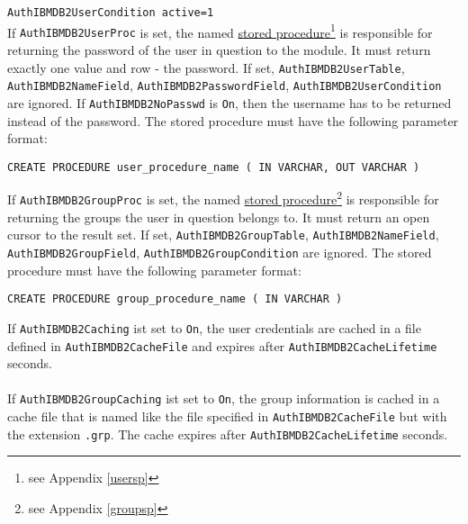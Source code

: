 \documentclass[11pt,letterpaper]{article}
\begin{document}
{\tt AuthIBMDB2UserCondition active=1}\\
\newpage
\noindent
If {\tt AuthIBMDB2UserProc} is set, the named \hyperlink{husersp}{stored procedure}\footnote{see Appendix \ref{usersp}} is responsible for returning the password of the user in question to the module. It must return exactly one value and row - the password. If set, {\tt AuthIBMDB2UserTable}, {\tt AuthIBMDB2NameField}, {\tt AuthIBMDB2PasswordField}, {\tt AuthIBMDB2UserCondition} are ignored. If {\tt AuthIBMDB2NoPasswd} is {\tt On}, then the username has to be returned instead of the password. The stored procedure must have the following parameter format:
\begin{verbatim}
CREATE PROCEDURE user_procedure_name ( IN VARCHAR, OUT VARCHAR )
\end{verbatim}
If {\tt AuthIBMDB2GroupProc} is set, the named \hyperlink{hgroupsp}{stored procedure}\footnote{see Appendix \ref{groupsp}} is responsible for returning the groups the user in question belongs to. It must return an open cursor to the result set. If set, {\tt AuthIBMDB2GroupTable}, {\tt AuthIBMDB2NameField}, {\tt AuthIBMDB2GroupField}, {\tt AuthIBMDB2GroupCondition} are ignored. The stored procedure must have the following parameter format:
\begin{verbatim}
CREATE PROCEDURE group_procedure_name ( IN VARCHAR )
\end{verbatim}
If {\tt AuthIBMDB2Caching} ist set to {\tt On}, the user credentials are cached in a file defined in {\tt AuthIBMDB2CacheFile} and expires after {\tt AuthIBMDB2CacheLifetime} seconds.\\
\\
If {\tt AuthIBMDB2GroupCaching} ist set to {\tt On}, the group information is cached in a cache file that is named like the file specified in {\tt AuthIBMDB2CacheFile} but with the extension {\tt .grp}. The cache expires after {\tt AuthIBMDB2CacheLifetime} seconds.
\newpage
\end{document}
